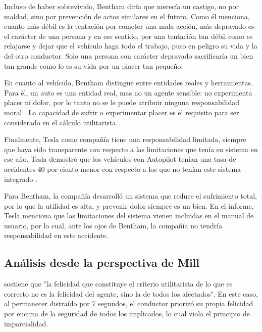 Incluso de haber sobrevivido, Bentham diría que merecía un castigo, no por maldad, sino por prevención de actos similares en el futuro. Como él menciona, cuanto más débil es la tentación por cometer una mala acción, más depravado es el carácter de una persona \citep{bentham1789introduction} y en ese sentido, por una tentación tan débil como es relajarse y dejar que el vehículo haga todo el trabajo, puso en peligro su vida y la del otro conductor. Solo una persona con carácter depravado sacrificaría un bien tan grande como lo es su vida por un placer tan pequeño.

\medskip

En cuanto al vehículo, Bentham distingue entre entidades reales y herramientas. Para él, un auto es una entidad real, mas no un agente sensible: no experimenta placer ni dolor, por lo tanto no se le puede atribuir ninguna responsabilidad moral \citep{schofield2020jeremy}. La capacidad de sufrir o experimentar placer es el requisito para ser considerado en el cálculo utilitarista \citep{bentham1789introduction}.

\medskip

Finalmente, Tesla como compañía tiene una responsabilidad limitada, siempre que haya sido transparente con respecto a las limitaciones que tenía su sistema en ese año. Tesla demostró que los vehículos con Autopilot tenían una tasa de accidentes 40 por ciento menor con respecto a los que no tenían este sistema integrado \citep{nhtsa2017pe16007}.

Para Bentham, la compañía desarrolló un sistema que reduce el sufrimiento total, por lo que la utilidad es alta, y prevenir dolor siempre es un bien. En el informe, Tesla menciona que las limitaciones del sistema vienen incluidas en el manual de usuario, por lo cual, ante los ojos de Bentham, la compañía no tendría responsabilidad en este accidente.

\subsection{Análisis desde la perspectiva de Mill}

\citet{mill2014utilitarismo} sostiene que "la felicidad que constituye el criterio utilitarista de lo que es correcto no es la felicidad del agente, sino la de todos los afectados". En este caso, al permanecer distraído por 7 segundos, el conductor priorizó su propia felicidad por encima de la seguridad de todos los implicados, lo cual viola el principio de imparcialidad.

